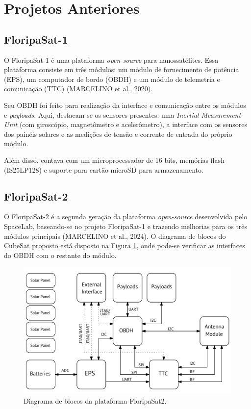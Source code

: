 
\section{Projetos Anteriores}

\subsection{FloripaSat-1}
O FloripaSat-1 é uma plataforma \textit{open-source} para nanossatélites. Essa plataforma consiste em três módulos: um módulo de fornecimento de potência (EPS), um computador de bordo (OBDH) e um módulo de telemetria e comunicação (TTC) (MARCELINO et al., 2020).

Seu OBDH foi feito para realização da interface e comunicação entre os módulos e \textit{payloads}. Aqui, destacam-se os sensores presentes: uma \textit{Inertial Measurement Unit} (com giroscópio, magnetômetro e acelerômetro), a interface com os sensores dos painéis solares e as medições de tensão e corrente de entrada do próprio módulo.

Além disso, contava com um microprocessador de 16 bits, memórias flash (IS25LP128) e suporte para cartão microSD para armazenamento.

\subsection{FloripaSat-2}
O FloripaSat-2 é a segunda geração da plataforma \textit{open-source} desenvolvida pelo SpaceLab, baseando-se no projeto FloripaSat-1 e trazendo melhorias para os três módulos principais (MARCELINO et al., 2024). O diagrama de blocos do CubeSat proposto está disposto na Figura \ref{fig:floripasat2}, onde pode-se verificar as interfaces do OBDH com o restante do módulo.

\begin{figure}[H]
    \centering
    \includegraphics[scale=0.8]{images/floripasat2.png}
    \caption{Diagrama de blocos da plataforma FloripaSat2.}
    \label{fig:floripasat2}
\end{figure}

